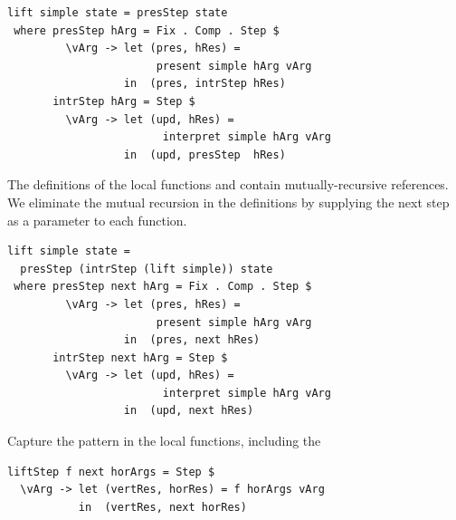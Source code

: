 \documentclass[preprint,natbib]{sigplanconf}
\begin{document}
\begin{small} %
\begin{verbatim}
lift simple state = presStep state 
 where presStep hArg = Fix . Comp . Step $
         \vArg -> let (pres, hRes) = 
                       present simple hArg vArg
                  in  (pres, intrStep hRes)
       intrStep hArg = Step $
         \vArg -> let (upd, hRes) = 
                        interpret simple hArg vArg
                  in  (upd, presStep  hRes)
\end{verbatim}
\end{small}

The definitions of the local functions  and  contain mutually-recursive references. We eliminate the mutual recursion in the definitions by supplying the next step as a parameter to each function.

      
      
\begin{small} %
\begin{verbatim}
lift simple state =
  presStep (intrStep (lift simple)) state
 where presStep next hArg = Fix . Comp . Step $
         \vArg -> let (pres, hRes) = 
                       present simple hArg vArg
                  in  (pres, next hRes)
       intrStep next hArg = Step $
         \vArg -> let (upd, hRes) = 
                        interpret simple hArg vArg
                  in  (upd, next hRes)
\end{verbatim}
\end{small}

Capture the pattern in the local functions, including the 

\begin{small} %
\begin{verbatim}
liftStep f next horArgs = Step $ 
  \vArg -> let (vertRes, horRes) = f horArgs vArg
           in  (vertRes, next horRes)
\end{verbatim}%
\end{small}
\end{document}
